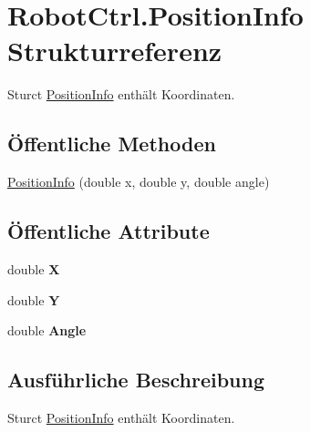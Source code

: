 \hypertarget{struct_robot_ctrl_1_1_position_info}{
\section{RobotCtrl.PositionInfo Strukturreferenz}
\label{struct_robot_ctrl_1_1_position_info}
}


Sturct \hyperlink{struct_robot_ctrl_1_1_position_info}{PositionInfo} enth\"{a}lt Koordinaten.  


\subsection*{Öffentliche Methoden}
\begin{DoxyCompactItemize}
\item 
\hyperlink{struct_robot_ctrl_1_1_position_info_a437f826ea5eb342dc35bdf9100c38b69}{PositionInfo} (double x, double y, double angle)
\end{DoxyCompactItemize}
\subsection*{Öffentliche Attribute}
\begin{DoxyCompactItemize}
\item 
\hypertarget{struct_robot_ctrl_1_1_position_info_a004e97e7977e8a19966104d0d1f3de84}{
double {\bfseries X}}
\label{struct_robot_ctrl_1_1_position_info_a004e97e7977e8a19966104d0d1f3de84}

\item 
\hypertarget{struct_robot_ctrl_1_1_position_info_a4e06789a38efca8072df7b9f21cd552e}{
double {\bfseries Y}}
\label{struct_robot_ctrl_1_1_position_info_a4e06789a38efca8072df7b9f21cd552e}

\item 
\hypertarget{struct_robot_ctrl_1_1_position_info_a12ed93794ca7fc28db9b5ce3afb53da3}{
double {\bfseries Angle}}
\label{struct_robot_ctrl_1_1_position_info_a12ed93794ca7fc28db9b5ce3afb53da3}

\end{DoxyCompactItemize}


\subsection{Ausführliche Beschreibung}
Sturct \hyperlink{struct_robot_ctrl_1_1_position_info}{PositionInfo} enth\"{a}lt Koordinaten. 

